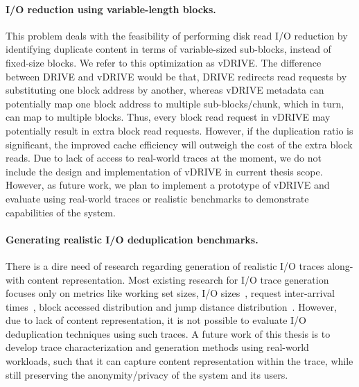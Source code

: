 \paragraph{I/O reduction using variable-length blocks.}
This problem deals with the feasibility of performing disk
read I/O reduction by identifying duplicate content in terms of
variable-sized sub-blocks, instead of fixed-size blocks.
We refer to this optimization as vDRIVE.
The difference between DRIVE and vDRIVE would be that, DRIVE
redirects read requests by substituting one block address by
another, whereas vDRIVE metadata can potentially map one block
address to multiple sub-blocks/chunk, which in turn, can map to multiple blocks.
Thus, every block read request in vDRIVE may potentially result
in extra block read requests. However, if the duplication ratio
is significant, the improved cache efficiency will outweigh the
cost of the extra block reads.
Due to lack of access to real-world traces at the moment, we
do not include the design and implementation of vDRIVE in current
thesis scope.
However, as future work, we plan to implement a prototype of vDRIVE
and evaluate using real-world traces or
realistic benchmarks to demonstrate capabilities of the system.


\paragraph{Generating realistic I/O deduplication benchmarks.}
There is a dire need of research regarding generation of
realistic I/O traces along-with content representation. Most 
existing research for I/O trace generation focuses only on metrics
like working set sizes, I/O sizes~\cite{flexi-replay},
request inter-arrival times~\cite{storagereplay},
block accessed distribution and
jump distance distribution~\cite{jump-based-synthetic}. However,
due to lack of content representation, it is not possible
to evaluate I/O deduplication techniques using such traces.
A future work of this thesis is to develop trace
characterization and generation methods using real-world
workloads, such that it can capture
content representation within the trace, while still preserving
the anonymity/privacy of the system and its users.

